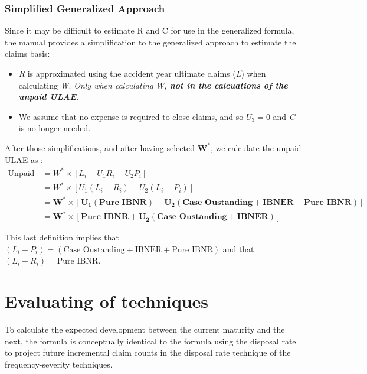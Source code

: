 \documentclass[11pt, english]{memoir}
\numberwithin{definition}{section}
\begin{document}
\subsection{Simplified Generalized Approach}	
	Since it may be difficult to estimate R and C for use in the generalized formula, the manual provides a simplification to the generalized approach to estimate the claims basis:
	\begin{itemize}
		\item \emph{R} is approximated using the accident year ultimate claims (\emph{L}) when calculating \emph{W}. \emph{Only when calculating \emph{W}, \textbf{not in the calcuations of the unpaid ULAE}}. 
		\item We assume that no expense is required to close claims, and so $ U_{3} = 0$ and \emph{C} is no longer needed. 
	\end{itemize}
	After those simplifications, and after having selected $ \mathbf{W^{*}} $, we calculate the unpaid ULAE as :
	\begin{align*}
	\text{Unpaid ULAE} &= W^{*} \times \left[ L_{i} - U_{1}R_{i} - U_{2}P_{i}\right]\\
	&= W^{*} \times \left[ U_{1}(L_{i} - R_{i}) - U_{2}(L_{i} - P_{i})\right]\\
	&= \mathbf{W^{*} \times \left[ U_{1}(\textbf{Pure IBNR}) + U_{2}(\textbf{Case Oustanding} + \textbf{IBNER}+ \textbf{Pure IBNR})\right]}\\
	&= \mathbf{W^{*} \times \left[ \textbf{Pure IBNR} + U_{2}(\textbf{Case Oustanding} + \textbf{IBNER})\right]}
	\end{align*}
	
	This last definition implies that $ (L_{i} - P_{i}) = (\text{Case Oustanding} + \text{IBNER}+ \text{Pure IBNR}) $ and that $ (L_{i} - R_{i}) = \text{Pure IBNR} $.
	
	
	
	
	
	
	
	
	
	









\chapter{Evaluating of techniques}

To calculate the expected development between the current maturity and the next, the formula is conceptually identical to the formula using the disposal rate to project future incremental claim counts in the disposal rate technique of the frequency-severity techniques. 
\end{document}
